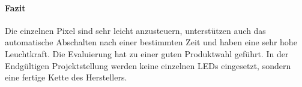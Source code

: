 \paragraph{Fazit}
Die einzelnen Pixel sind sehr leicht anzusteuern, unterstützen auch das automatische Abschalten nach einer bestimmten Zeit und haben eine sehr hohe Leuchtkraft. Die Evaluierung hat zu einer guten Produktwahl geführt. In der Endgültigen Projektstellung werden keine einzelnen LEDs eingesetzt, sondern eine fertige Kette des Herstellers. 
